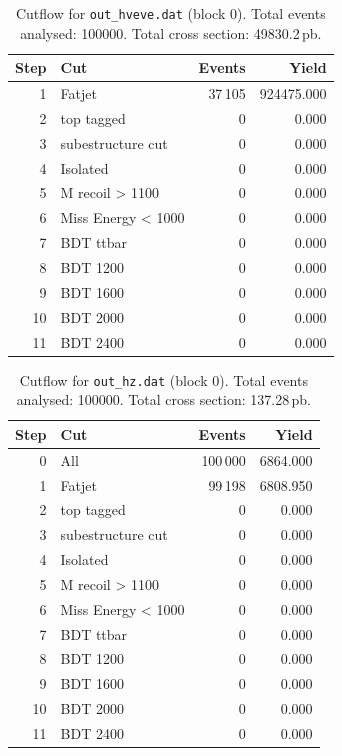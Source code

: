 \documentclass{article}
\begin{document}
\begin{table}[H]
\centering
\begin{tabular}{r l r r}
\toprule
Step & Cut & Events & Yield \\
\midrule
1 & Fatjet & 37\,105 & 924475.000 \\
2 & top tagged & 0 & 0.000 \\
3 & subestructure cut & 0 & 0.000 \\
4 & Isolated & 0 & 0.000 \\
5 & M recoil > 1100 & 0 & 0.000 \\
6 & Miss Energy < 1000 & 0 & 0.000 \\
7 & BDT ttbar & 0 & 0.000 \\
8 & BDT 1200 & 0 & 0.000 \\
9 & BDT 1600 & 0 & 0.000 \\
10 & BDT 2000 & 0 & 0.000 \\
11 & BDT 2400 & 0 & 0.000 \\
\bottomrule
\end{tabular}
\caption{Cutflow for \texttt{out\_hveve.dat} (block 0). Total events analysed: 100000. Total cross section: 49830.2\,pb.}
\label{tab:cutflow-out-hveve-dat}
\end{table}

\begin{table}[H]
\centering
\begin{tabular}{r l r r}
\toprule
Step & Cut & Events & Yield \\
\midrule
0 & All & 100\,000 & 6864.000 \\
1 & Fatjet & 99\,198 & 6808.950 \\
2 & top tagged & 0 & 0.000 \\
3 & subestructure cut & 0 & 0.000 \\
4 & Isolated & 0 & 0.000 \\
5 & M recoil > 1100 & 0 & 0.000 \\
6 & Miss Energy < 1000 & 0 & 0.000 \\
7 & BDT ttbar & 0 & 0.000 \\
8 & BDT 1200 & 0 & 0.000 \\
9 & BDT 1600 & 0 & 0.000 \\
10 & BDT 2000 & 0 & 0.000 \\
11 & BDT 2400 & 0 & 0.000 \\
\bottomrule
\end{tabular}
\caption{Cutflow for \texttt{out\_hz.dat} (block 0). Total events analysed: 100000. Total cross section: 137.28\,pb.}
\label{tab:cutflow-out-hz-dat}
\end{table}
\end{document}
